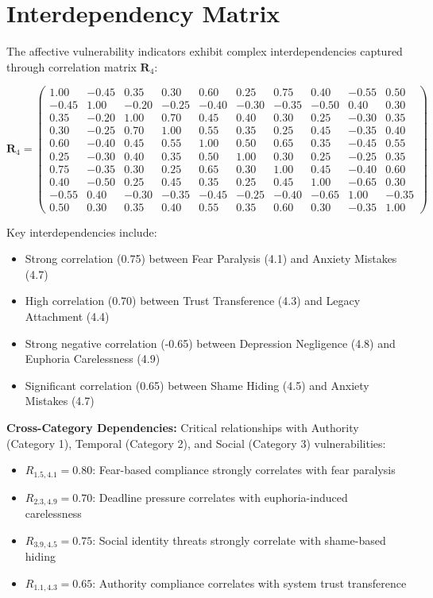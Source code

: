 \documentclass[11pt,a4paper]{article}
\begin{document}
\section{Interdependency Matrix}

The affective vulnerability indicators exhibit complex interdependencies captured through correlation matrix $\mathbf{R}_{4}$:

\begin{equation}
\mathbf{R}_4 = \begin{pmatrix}
1.00 & -0.45 & 0.35 & 0.30 & 0.60 & 0.25 & 0.75 & 0.40 & -0.55 & 0.50 \\
-0.45 & 1.00 & -0.20 & -0.25 & -0.40 & -0.30 & -0.35 & -0.50 & 0.40 & 0.30 \\
0.35 & -0.20 & 1.00 & 0.70 & 0.45 & 0.40 & 0.30 & 0.25 & -0.30 & 0.35 \\
0.30 & -0.25 & 0.70 & 1.00 & 0.55 & 0.35 & 0.25 & 0.45 & -0.35 & 0.40 \\
0.60 & -0.40 & 0.45 & 0.55 & 1.00 & 0.50 & 0.65 & 0.35 & -0.45 & 0.55 \\
0.25 & -0.30 & 0.40 & 0.35 & 0.50 & 1.00 & 0.30 & 0.25 & -0.25 & 0.35 \\
0.75 & -0.35 & 0.30 & 0.25 & 0.65 & 0.30 & 1.00 & 0.45 & -0.40 & 0.60 \\
0.40 & -0.50 & 0.25 & 0.45 & 0.35 & 0.25 & 0.45 & 1.00 & -0.65 & 0.30 \\
-0.55 & 0.40 & -0.30 & -0.35 & -0.45 & -0.25 & -0.40 & -0.65 & 1.00 & -0.35 \\
0.50 & 0.30 & 0.35 & 0.40 & 0.55 & 0.35 & 0.60 & 0.30 & -0.35 & 1.00
\end{pmatrix}
\end{equation}

Key interdependencies include:
\begin{itemize}
\item Strong correlation (0.75) between Fear Paralysis (4.1) and Anxiety Mistakes (4.7)
\item High correlation (0.70) between Trust Transference (4.3) and Legacy Attachment (4.4)
\item Strong negative correlation (-0.65) between Depression Negligence (4.8) and Euphoria Carelessness (4.9)
\item Significant correlation (0.65) between Shame Hiding (4.5) and Anxiety Mistakes (4.7)
\end{itemize}

\textbf{Cross-Category Dependencies:}
Critical relationships with Authority (Category 1), Temporal (Category 2), and Social (Category 3) vulnerabilities:
\begin{itemize}
\item $R_{1.5,4.1} = 0.80$: Fear-based compliance strongly correlates with fear paralysis
\item $R_{2.3,4.9} = 0.70$: Deadline pressure correlates with euphoria-induced carelessness
\item $R_{3.9,4.5} = 0.75$: Social identity threats strongly correlate with shame-based hiding
\item $R_{1.1,4.3} = 0.65$: Authority compliance correlates with system trust transference
\end{itemize}
\end{document}
